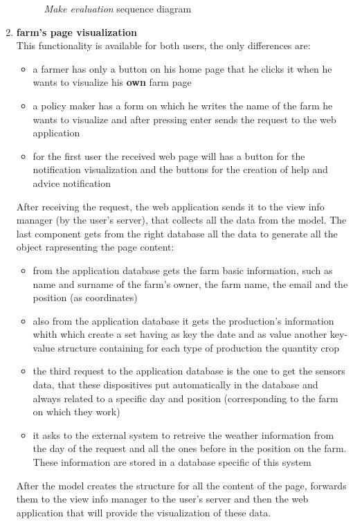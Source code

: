 \begin{enumerate}
\begin{figure}[H]
\begin{center}
        \caption{\emph{Make evaluation} sequence diagram}
        \label{fig:sequence6}
        \end{center}
    \end{figure}
    \item \textbf{farm's page visualization}\\
    This functionality is available for both users, the only differences are:
    \begin{itemize}
        \item a farmer has only a button on his home page that he clicks it when he wants to visualize his \textbf{own} farm page
        \item a policy maker has a form on which he writes the name of the farm he wants to visualize and after pressing enter sends the request to the web application
        \item for the first user the received web page will has a button for the notification visualization and the buttons for the creation of  help and advice notification
    \end{itemize}
    After receiving the request, the web application sends it to the view info manager (by the user's server), that collects all the data from the model. The last component gets from the right database all the data to generate all the object rapresenting the page content:
    \begin{itemize}
        \item from the application database gets the farm basic information, such as name and surname of the farm's owner, the farm name, the email and the position (as coordinates)
        \item also from the application database it gets the production's information whith which create a set having as key the date and as value another key-value structure containing for each type of production the quantity crop 
        \item the third request to the application database is the one to get the sensors data, that these dispositives put automatically in the database and always related to a specific day and position (corresponding to the farm on which they work)
        \item it asks to the external system to retreive the weather information from the day of the request and all the ones before in the position on the farm. These information are stored in a database specific of this system
    \end{itemize}
    After the model creates the structure for all the content of the page, forwards them to the view info manager to the user's server and then the web application that will provide the visualization of these data.

\end{enumerate}
